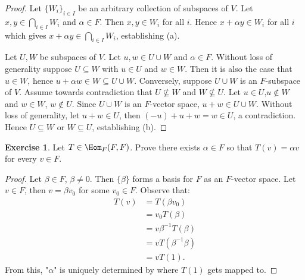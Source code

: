 \documentclass[10pt,twoside,openany]{memoir}
\theoremstyle{plain}
\theoremstyle{definition}
\newtheorem{exercise}{Exercise}
\theoremstyle{remark}
\numberwithin{equation}{section}
\begin{document}
        \begin{proof}
            Let $\{W_i\}_{i \in I}$ be an arbitrary collection of subspaces of $V$. Let $x,y \in \bigcap_{i \in I}W_i$ and $\alpha \in F$. Then $x,y \in W_i$ for all $i$. Hence $x+\alpha y \in W_i$ for all $i$ which gives $x+\alpha y \in \bigcap_{i \in I}W_i$, establishing (a).

            Let $U,W$ be subspaces of $V$. Let $u,w \in U \cup W$ and $\alpha \in F$. Without loss of generality suppose $U \subseteq W$ with $u \in U$ and $w\in W$. Then it is also the case that $u \in W$, hence $u + \alpha w \in W \subseteq U \cup W$. Conversely, suppose $U \cup W$ is an $F$-subspace of $V$. Assume towards contradiction that $U \not\subseteq W$ and $W \not\subseteq U$. Let $u \in U$,$u \not\in W$ and $w \in W$, $w \not\in U$. Since $U \cup W$ is an $F$-vector space, $u + w \in  U \cup W$. Without loss of generality, let $u + w \in U$, then $(-u) +u + w = w \in U$, a contradiction. Hence $U \subseteq W$ or $W \subseteq U$, establishing (b).
        \end{proof}
    \vspace{10pt}
    \begin{exercise}
        Let $T \in \Hom_F{(F,F)}$. Prove there exists $\alpha \in F$ so that $T(v) = \alpha v $ for every $v \in F$.
    \end{exercise}
        \begin{proof}
            Let $\beta \in F$, $\beta \neq 0$. Then $\{\beta\}$ forms a basis for $F$ as an $F$-vector space. Let $v \in F$, then $v = \beta v_0$ for some $v_0 \in F$. Observe that:
                \begin{equation*}
                \begin{split}
                    T(v)
                    & = T(\beta v_0) \\
                    & = v_0 T(\beta) \\
                    & = v \beta^{-1}T(\beta) \\
                    & = v T(\beta^{-1} \beta) \\
                    & = v T(1).
                \end{split}
                \end{equation*}
            From this, "$\alpha$" is uniquely determined by where $T(1)$ gets mapped to.
        \end{proof}
\end{document}
